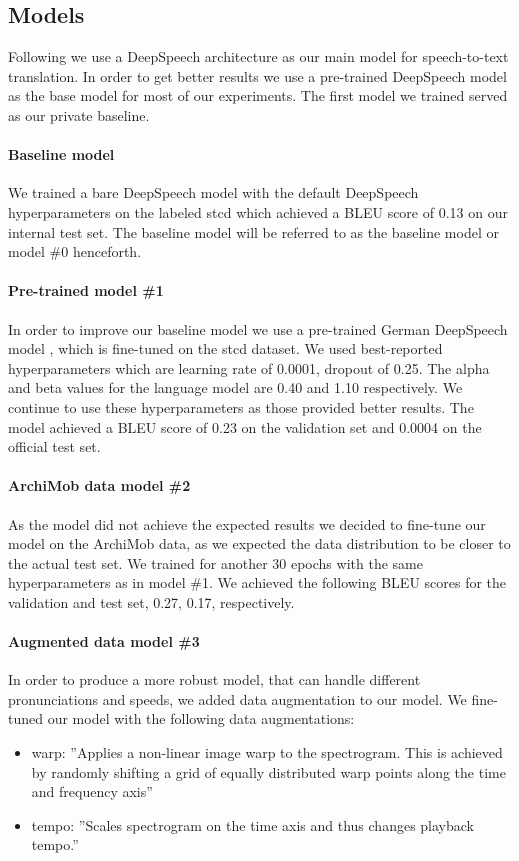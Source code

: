 
\subsection{Models}
Following  we use a DeepSpeech architecture \cite{Hannun2014DeepSS} as our main model for speech-to-text translation. In order to get better results we use a
pre-trained DeepSpeech model \cite{DeepSpeechGerman090} as the base model for most of our experiments. The first model we trained served as our private baseline. \paragraph{Baseline model} We trained a bare DeepSpeech model with the default DeepSpeech hyperparameters on the labeled \gls{stcd} which achieved a BLEU score of 0.13 on our internal test set. The baseline model will be referred to as the baseline model or model \#0 henceforth.
\paragraph{Pre-trained model \#1} In order to improve our baseline model we use a pre-trained
German DeepSpeech model \cite{DeepSpeechGerman090}, which is fine-tuned on the \gls{stcd} dataset. We used \citet{Agarwal2020LTLUDEAL} best-reported hyperparameters which are learning rate of 0.0001, dropout of 0.25. The alpha and beta values for the language model are 0.40 and 1.10 respectively. We continue to use these hyperparameters as those provided better results. The model achieved a BLEU score of
0.23 on the validation set and 0.0004 on the official test set.
\paragraph{ArchiMob data model \#2} As the  model did not achieve the expected results we decided to fine-tune our model on the ArchiMob data, as we expected the data distribution to be closer
to the actual test set. We trained for another 30 epochs with the same hyperparameters as in model \#1. We achieved the following BLEU scores for the validation and test set, 0.27, 0.17,
respectively.
\paragraph{Augmented data model \#3} In order to produce a more robust model, that can handle different pronunciations and speeds, we added data augmentation to our  model. We fine-tuned our
model with the following data augmentations:
\begin{itemize}
    \item warp: ''Applies a non-linear image warp to the spectrogram. This is achieved by randomly shifting a grid of equally distributed warp points along the time and frequency axis''
    \cite{DeepSpeechAugmentation}
    \item tempo: ''Scales spectrogram on the time axis and thus changes playback tempo.'' \cite{DeepSpeechAugmentation}
\end{itemize}

